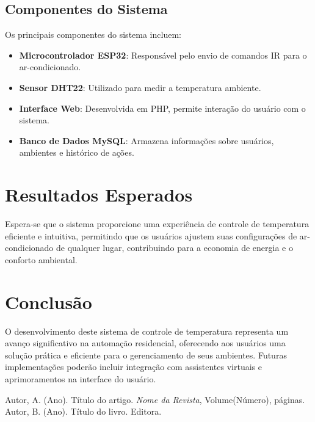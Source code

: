 \documentclass[article]{sbc}
\begin{document}
\subsection{Componentes do Sistema}
Os principais componentes do sistema incluem:
\begin{itemize}
    \item \textbf{Microcontrolador ESP32}: Responsável pelo envio de comandos IR para o ar-condicionado.
    \item \textbf{Sensor DHT22}: Utilizado para medir a temperatura ambiente.
    \item \textbf{Interface Web}: Desenvolvida em PHP, permite interação do usuário com o sistema.
    \item \textbf{Banco de Dados MySQL}: Armazena informações sobre usuários, ambientes e histórico de ações.
\end{itemize}

\section{Resultados Esperados}
Espera-se que o sistema proporcione uma experiência de controle de temperatura eficiente e intuitiva, permitindo que os usuários ajustem suas configurações de ar-condicionado de qualquer lugar, contribuindo para a economia de energia e o conforto ambiental.

\section{Conclusão}
O desenvolvimento deste sistema de controle de temperatura representa um avanço significativo na automação residencial, oferecendo aos usuários uma solução prática e eficiente para o gerenciamento de seus ambientes. Futuras implementações poderão incluir integração com assistentes virtuais e aprimoramentos na interface do usuário.

\begin{thebibliography}{99}
 Autor, A. (Ano). Título do artigo. \textit{Nome da Revista}, Volume(Número), páginas.
 Autor, B. (Ano). Título do livro. Editora.
\end{thebibliography}
\end{document}
